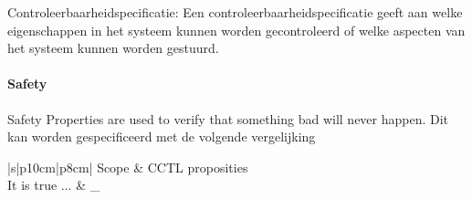 Controleerbaarheidspecificatie:
Een controleerbaarheidspecificatie geeft aan welke eigenschappen in het systeem kunnen worden gecontroleerd of welke aspecten van het systeem kunnen worden gestuurd.

\paragraph{Safety}
Safety Properties are used to verify that something
bad will never happen. Dit kan worden gespecificeerd met de volgende vergelijking





\begin{longtable} { |s|p{10cm}|p{8cm}| }
	\hline
	Scope & CCTL proposities \\
	\hline
	It is true ... & _ \\
	

\end{longtable}
